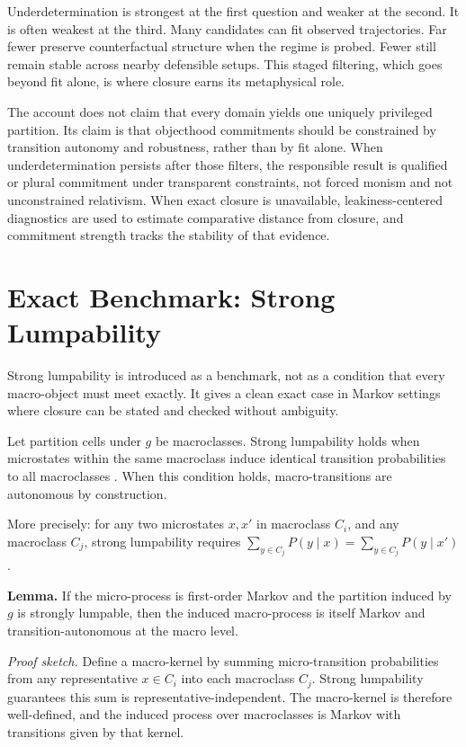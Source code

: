 Underdetermination is strongest at the first question and weaker at the
second. It is often weakest at the third. Many candidates can fit
observed trajectories. Far fewer preserve counterfactual structure when
the regime is probed. Fewer still remain stable across nearby defensible
setups. This staged filtering, which goes beyond fit alone, is where
closure earns its metaphysical role.

The account does not claim that every domain yields one uniquely
privileged partition. Its claim is that objecthood commitments should be
constrained by transition autonomy and robustness, rather than by fit
alone. When underdetermination persists after those filters, the
responsible result is qualified or plural commitment under transparent
constraints, not forced monism and not unconstrained relativism. When
exact closure is unavailable, leakiness-centered diagnostics are used to
estimate comparative distance from closure, and commitment strength
tracks the stability of that evidence.

\section{Exact Benchmark: Strong
  Lumpability}\label{exact-benchmark-strong-lumpability}

Strong lumpability is introduced as a benchmark, not as a condition
that every macro-object must meet exactly. It gives a clean exact case in Markov
settings where closure can be stated and checked without ambiguity.

Let partition cells under \(g\) be macroclasses. Strong lumpability
holds when microstates within the same macroclass induce identical
transition probabilities to all macroclasses \citep{kemeny1960}. When this condition holds,
macro-transitions are autonomous by construction.

More precisely: for any two microstates \(x, x'\) in macroclass \(C_i\),
and any macroclass \(C_j\), strong lumpability requires
\(\sum_{y \in C_j} P(y \mid x) = \sum_{y \in C_j} P(y \mid x')\).

\textbf{Lemma.} If the micro-process is first-order Markov and the
partition induced by \(g\) is strongly lumpable, then the induced
macro-process is itself Markov and transition-autonomous at the macro
level.

\emph{Proof sketch.} Define a macro-kernel by summing micro-transition
probabilities from any representative \(x \in C_i\) into each macroclass
\(C_j\). Strong lumpability guarantees this sum is
representative-independent. The macro-kernel is therefore well-defined,
and the induced process over macroclasses is Markov with transitions
given by that kernel.

